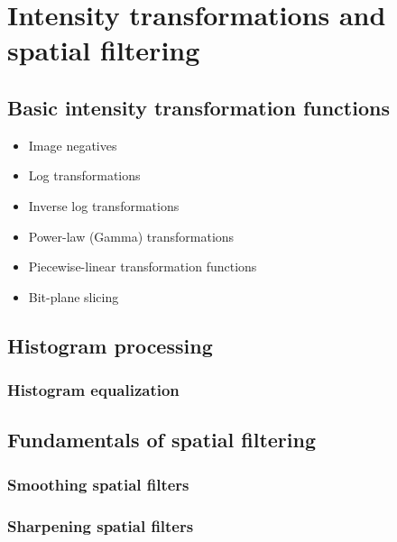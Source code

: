 \section{Intensity transformations and spatial filtering}

\subsection{Basic intensity transformation functions}

\begin{itemize}
	\item Image negatives
	\item Log transformations
	\item Inverse log transformations
	\item Power-law (Gamma) transformations
	\item Piecewise-linear transformation functions
	\item Bit-plane slicing
	
\end{itemize}

\subsection{Histogram processing}
\subsubsection{Histogram equalization}

\subsection{Fundamentals of spatial filtering}
\subsubsection{Smoothing spatial filters}
\subsubsection{Sharpening spatial filters}
